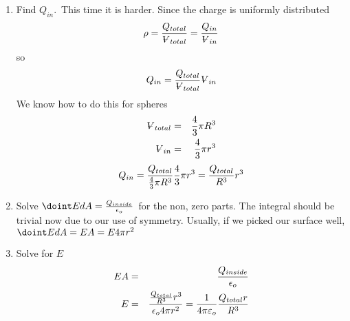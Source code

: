 \documentclass{report}
\begin{document}
\begin{enumerate}
\item {\small Find }$Q_{in}.${\small \ This time it is harder. Since the
charge is uniformly distributed }%
\begin{equation*}
\rho =\frac{Q_{total}}{%
\ooalign{\hfil$V$\hfil\cr\kern0.1em--\hfil\cr}%
_{total}}=\frac{Q_{in}}{%
\ooalign{\hfil$V$\hfil\cr\kern0.1em--\hfil\cr}%
_{in}} 
\end{equation*}%
{\small so }%
\begin{equation*}
Q_{in}=\frac{Q_{total}}{%
\ooalign{\hfil$V$\hfil\cr\kern0.1em--\hfil\cr}%
_{total}}%
\ooalign{\hfil$V$\hfil\cr\kern0.1em--\hfil\cr}%
_{in} 
\end{equation*}%
{\small We know how to do this for spheres }%
\begin{eqnarray*}
\ooalign{\hfil$V$\hfil\cr\kern0.1em--\hfil\cr}%
_{total} &=&\frac{4}{3}\pi R^{3} \\
\ooalign{\hfil$V$\hfil\cr\kern0.1em--\hfil\cr}%
_{in} &=&\frac{4}{3}\pi r^{3}
\end{eqnarray*}%
\begin{equation*}
Q_{in}=\frac{Q_{total}}{\frac{4}{3}\pi R^{3}}\frac{4}{3}\pi r^{3}=\frac{%
Q_{total}}{R^{3}}r^{3} 
\end{equation*}

\item {\small Solve }$\doint EdA=\frac{Q_{inside}}{\epsilon _{o}}${\small \
for the non, zero parts. The integral should be trivial now due to our use
of symmetry. Usually, if we picked our surface well, }$\doint EdA=EA=E4\pi
r^{2}$

\item {\small Solve for }$E$%
\begin{eqnarray*}
EA &=&\frac{Q_{inside}}{\epsilon _{o}} \\
E &=&\frac{\frac{Q_{total}}{R^{3}}r^{3}}{\epsilon _{o}4\pi r^{2}}=\frac{1}{%
4\pi \varepsilon _{o}}\frac{Q_{total}r}{R^{3}}
\end{eqnarray*}
\end{enumerate}

\normalsize%
\end{document}
